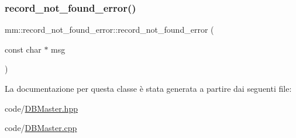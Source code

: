 \subsubsection{\texorpdfstring{record\+\_\+not\+\_\+found\+\_\+error()}{record\_not\_found\_error()}\hspace{0.1cm}{\footnotesize\ttfamily [2/2]}}
{\footnotesize\ttfamily mm\+::record\+\_\+not\+\_\+found\+\_\+error\+::record\+\_\+not\+\_\+found\+\_\+error (\begin{DoxyParamCaption}\item[{const char $\ast$}]{msg }\end{DoxyParamCaption})\hspace{0.3cm}{\ttfamily [explicit]}}



La documentazione per questa classe è stata generata a partire dai seguenti file\+:\begin{DoxyCompactItemize}
\item 
code/\hyperlink{_d_b_master_8hpp}{D\+B\+Master.\+hpp}\item 
code/\hyperlink{_d_b_master_8cpp}{D\+B\+Master.\+cpp}\end{DoxyCompactItemize}
